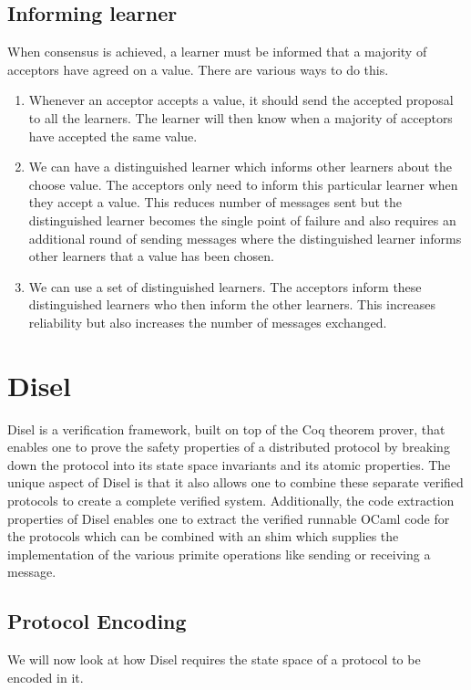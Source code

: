 \vspace{-4mm}
\subsection{Informing learner}
When consensus is achieved, a learner must be informed that a majority of acceptors
have agreed on a value. There are various ways to do this.

\begin{enumerate}
  \item Whenever an acceptor accepts a value, it should send the accepted proposal
    to all the learners. The learner will then know when a majority of acceptors
    have accepted the same value.
  \item We can have a distinguished learner which informs other learners about
    the choose value. The acceptors only need to inform this particular learner
    when they accept a value. This reduces number of messages sent but the
    distinguished learner becomes the single point of failure and also requires
    an additional round of sending messages where the distinguished learner informs
    other learners that a value has been chosen.
  \item We can use a set of distinguished learners. The acceptors inform these
    distinguished learners who then inform the other learners. This increases
    reliability but also increases the number of messages exchanged.
\end{enumerate}

\section{Disel}
Disel \cite{9} is a verification framework, built on top of the Coq theorem prover,
that enables one to prove the safety properties of a distributed protocol by
breaking down the protocol into its state space invariants and its atomic properties.
The unique aspect of Disel is that it also allows one to combine these separate
verified protocols to create a complete verified system. Additionally, the
code extraction properties of Disel enables one to extract the verified runnable
OCaml code for the protocols which can be combined with an shim which supplies
the implementation of the various primite operations like sending or receiving
a message.

\subsection{Protocol Encoding}
We will now look at how Disel requires the state space of a protocol to be encoded in it.

